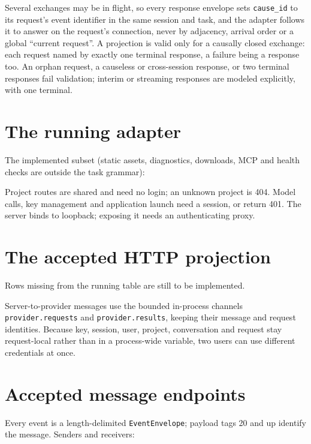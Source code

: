 Several exchanges may be in flight, so every response envelope sets
\texttt{cause\_id} to its request's event identifier in the same session and
task, and the adapter follows it to answer on the request's connection, never by
adjacency, arrival order or a global ``current request''. A projection is valid
only for a causally closed exchange: each request named by exactly one terminal
response, a failure being a response too. An orphan request, a causeless or
cross-session response, or two terminal responses fail validation; interim or
streaming responses are modeled explicitly, with one terminal.

\section{The running adapter}

The implemented subset (static assets, diagnostics, downloads, MCP and health
checks are outside the task grammar):



Project routes are shared and need no login; an unknown project is 404. Model
calls, key management and application launch need a session, or return 401. The
server binds to loopback; exposing it needs an authenticating proxy.

\section{The accepted HTTP projection}

Rows missing from the running table are still to be implemented.



Server-to-provider messages use the bounded in-process channels
\texttt{provider.requests} and \texttt{provider.results}, keeping their message and
request identities. Because key, session, user, project, conversation and request
stay request-local rather than in a process-wide variable, two users can use
different credentials at once.

\section{Accepted message endpoints}

Every event is a length-delimited \texttt{EventEnvelope}; payload tags 20 and up
identify the message. Senders and receivers:

